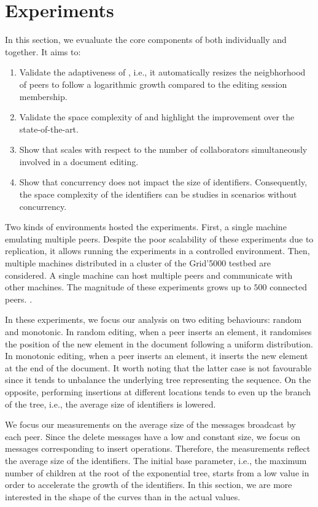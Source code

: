 \section{Experiments}
\label{sec:experiments}

In this section, we evualuate the core components of \CRATE both individually
and together. It aims to:
\begin{enumerate}[leftmargin=*]
\item Validate the adaptiveness of \SPRAY, i.e., it automatically resizes the
  neigbhorhood of peers to follow a logarithmic growth compared to the editing
  session membership.
\item Validate the space complexity of \LSEQ and highlight the improvement
  over the state-of-the-art.
\item Show that \CRATE scales with respect to the number of
  collaborators simultaneously involved in a document editing.
\item Show that concurrency does not impact the size of
  identifiers. Consequently, the space complexity of the identifiers can be
  studies in scenarios without concurrency.
\end{enumerate}

Two kinds of environments hosted the experiments. First, a single machine
emulating multiple peers. Despite the poor scalability of these experiments due
to replication, it allows running the experiments in a controlled
environment. Then, multiple machines distributed in a cluster of the Grid'5000
testbed are considered. A single machine can host multiple peers and
communicate with other machines. The magnitude of these experiments grows up to
$500$ connected peers. .

In these experiments, we focus our analysis on two editing behaviours: random
and monotonic. In random editing, when a peer inserts an element, it randomises
the position of the new element in the document following a uniform
distribution. In monotonic editing, when a peer inserts an element, it inserts
the new element at the end of the document. It worth noting that the latter case
is not favourable since it tends to unbalance the underlying tree representing
the sequence. On the opposite, performing insertions at different locations
tends to even up the branch of the tree, i.e., the average size of identifiers
is lowered.

We focus our measurements on the average size of the messages broadcast by each
peer. Since the delete messages have a low and constant size, we focus on
messages corresponding to insert operations. Therefore, the measurements
reflect the average size of the identifiers. The initial base parameter, i.e.,
the maximum number of children at the root of the exponential tree, starts from
a low value in order to accelerate the growth of the identifiers. In this
section, we are more interested in the shape of the curves than in the actual
values.

